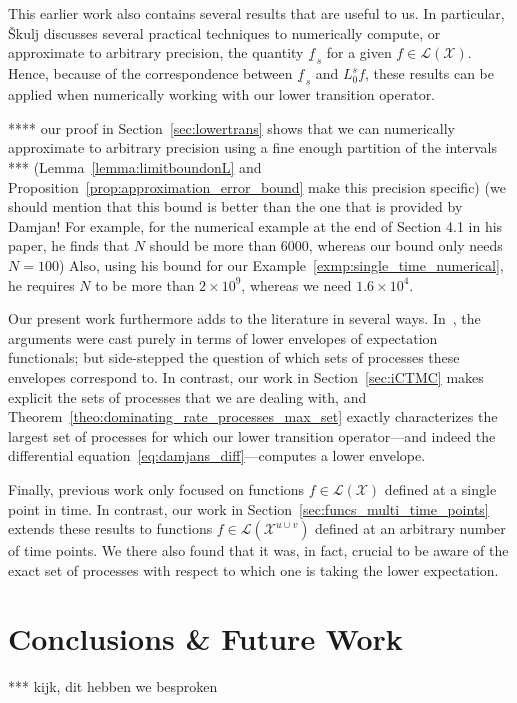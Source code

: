 \documentclass[10pt,a4paper]{paper}
\theoremstyle{definition}
\newcommand{\states}{\mathcal{X}}
\newcommand{\gambles}{\mathcal{L}}
\newcommand{\gamblesX}{\gambles(\states)}
\begin{document}
This earlier work also contains several results that are useful to us. In particular, {\v{S}}kulj discusses several practical techniques to numerically compute, or approximate to arbitrary precision, the quantity $\underline{f}_{\,s}$ for a given $f\in\gamblesX$. Hence, because of the correspondence between $\underline{f}_{\,s}$ and $L_0^sf$, these results can be applied when numerically working with our lower transition operator.

**** our proof in Section~\ref{sec:lowertrans} shows that we can numerically approximate to arbitrary precision using a fine enough partition of the intervals *** (Lemma~\ref{lemma:limitboundonL} and Proposition~\ref{prop:approximation_error_bound} make this precision specific) (we should mention that this bound is better than the one that is provided by Damjan! For example, for the numerical example at the end of Section 4.1 in his paper, he finds that $N$ should be more than $6000$, whereas our bound only needs $N=100$) Also, using his bound for our Example~\ref{exmp:single_time_numerical}, he requires $N$ to be more than $2\times 10^9$, whereas we need $1.6\times 10^4$.

Our present work furthermore adds to the literature in several ways. In~\cite{Skulj:2015cq}, the arguments were cast purely in terms of lower envelopes of expectation functionals; but side-stepped the question of which sets of processes these envelopes correspond to. In contrast, our work in Section~\ref{sec:iCTMC} makes explicit the sets of processes that we are dealing with, and Theorem~\ref{theo:dominating_rate_processes_max_set} exactly characterizes the largest set of processes for which our lower transition operator---and indeed the differential equation~\eqref{eq:damjans_diff}---computes a lower envelope.

Finally, previous work only focused on functions $f\in\gamblesX$ defined at a single point in time. In contrast, our work in Section~\ref{sec:funcs_multi_time_points} extends these results to functions $f\in\gambles(\states^{u\cup v})$ defined at an arbitrary number of time points. We there also found that it was, in fact, crucial to be aware of the exact set of processes with respect to which one is taking the lower expectation.

\section{Conclusions \& Future Work}\label{sec:conclusions}

*** kijk, dit hebben we besproken
\end{document}
